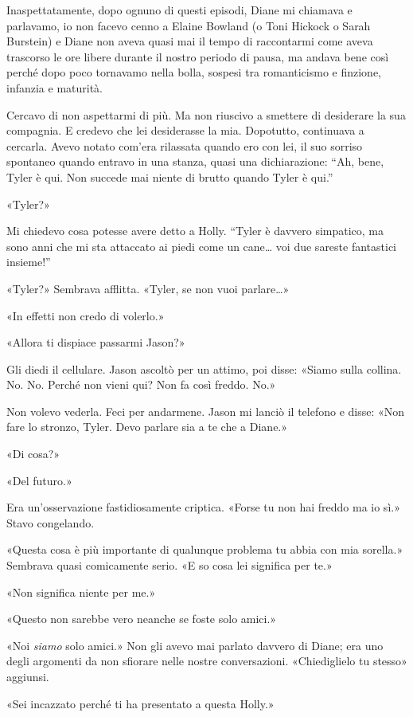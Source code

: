 Inaspettatamente, dopo ognuno di questi episodi, Diane mi chiamava e
parlavamo, io non facevo cenno a Elaine Bowland (o Toni Hickock o Sarah
Burstein) e Diane non aveva quasi mai il tempo di raccontarmi come aveva
trascorso le ore libere durante il nostro periodo di pausa, ma andava
bene così perché dopo poco tornavamo nella bolla, sospesi tra
romanticismo e finzione, infanzia e maturità.

Cercavo di non aspettarmi di più. Ma non riuscivo a smettere di
desiderare la sua compagnia. E credevo che lei desiderasse la mia.
Dopotutto, continuava a cercarla. Avevo notato com'era rilassata quando
ero con lei, il suo sorriso spontaneo quando entravo in una stanza,
quasi una dichiarazione: ``Ah, bene, Tyler è qui. Non succede mai niente
di brutto quando Tyler è qui.''

«Tyler?»

Mi chiedevo cosa potesse avere detto a Holly. ``Tyler è davvero
simpatico, ma sono anni che mi sta attaccato ai piedi come un
cane\ldots{} voi due sareste fantastici insieme!''

«Tyler?» Sembrava afflitta. «Tyler, se non vuoi parlare\ldots»

«In effetti non credo di volerlo.»

«Allora ti dispiace passarmi Jason?»

Gli diedi il cellulare. Jason ascoltò per un attimo, poi disse: «Siamo
sulla collina. No. No. Perché non vieni qui? Non fa così freddo. No.»

Non volevo vederla. Feci per andarmene. Jason mi lanciò il telefono e
disse: «Non fare lo stronzo, Tyler. Devo parlare sia a te che a Diane.»

«Di cosa?»

«Del futuro.»

Era un'osservazione fastidiosamente criptica. «Forse tu non hai freddo
ma io sì.» Stavo congelando.

«Questa cosa è più importante di qualunque problema tu abbia con mia
sorella.» Sembrava quasi comicamente serio. «E so cosa lei significa per
te.»

«Non significa niente per me.»

«Questo non sarebbe vero neanche se foste solo amici.»

«Noi \emph{siamo} solo amici.» Non gli avevo mai parlato davvero di
Diane; era uno degli argomenti da non sfiorare nelle nostre
conversazioni. «Chiediglielo tu stesso» aggiunsi.

«Sei incazzato perché ti ha presentato a questa Holly.»

